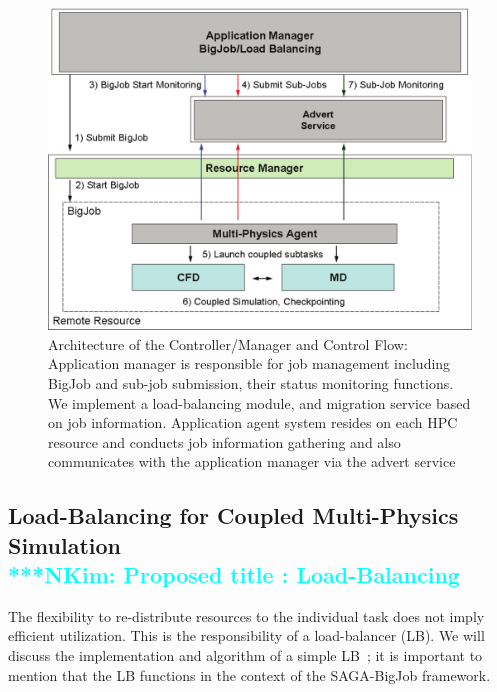 \documentclass[preprint,12pt]{elsarticle}
\newcommand{\Nkimnote}[1]{ {\textcolor{cyan} { ***NKim: #1 }}}
\newcommand{\Nkimnote}[1]{}
\begin{document}
\begin{figure}
\centering
\includegraphics[width=0.8\linewidth]{Structure_of_BigJob}
\caption{\small Architecture of the Controller/Manager and Control Flow: Application manager is responsible for job management including BigJob and sub-job submission, their status monitoring functions. We implement a load-balancing module, and migration service based on job information. Application agent system resides on each HPC resource and conducts job information gathering and also communicates with the application manager via the advert service}
\label{Fig:BigJob_Structure}
\vspace{-1em}
\end{figure}


\subsection{Load-Balancing for Coupled Multi-Physics Simulation
\\
\Nkimnote{Proposed title : Load-Balancing}}
The flexibility to re-distribute resources to the individual task does not imply efficient utilization. This is the responsibility of a load-balancer (LB). We will discuss the implementation and algorithm of a simple LB~\cite{Ko}; it is important to mention that the LB functions in the context of the SAGA-BigJob framework.
\end{document}
